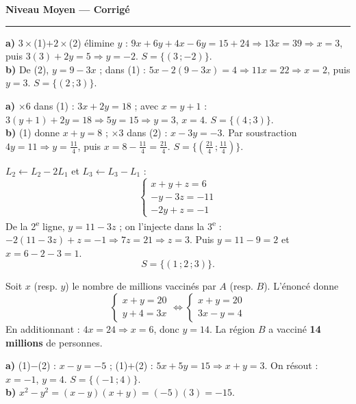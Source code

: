 \documentclass[11pt,a4paper]{article}
\begin{document}
\begin{center}
{\LARGE\bfseries\color{primarydark} Niveau Moyen — Corrigé}\\[2pt]
{\color{primary}\rule{0.45\textwidth}{1.2pt}}
\end{center}
\vspace{1mm}

\begin{corrige}[combinaison]
\textbf{a)} $3\times$(1)$+2\times$(2) élimine $y$ : $9x+6y+4x-6y=15+24\Rightarrow 13x=39\Rightarrow x=3$, puis
$3(3)+2y=5\Rightarrow y=-2$. $S=\{(3\,;-2)\}$.\\
\textbf{b)} De (2), $y=9-3x$ ; dans (1) : $5x-2(9-3x)=4\Rightarrow 11x=22\Rightarrow x=2$, puis $y=3$. $S=\{(2\,;3)\}$.
\end{corrige}

\begin{corrige}
\textbf{a)} $\times6$ dans (1) : $3x+2y=18$ ; avec $x=y+1$ : $3(y+1)+2y=18\Rightarrow 5y=15\Rightarrow y=3$, $x=4$. $S=\{(4\,;3)\}$.\\
\textbf{b)} (1) donne $x+y=8$ ; $\times3$ dans (2) : $x-3y=-3$. Par soustraction $4y=11\Rightarrow y=\tfrac{11}{4}$,
puis $x=8-\tfrac{11}{4}=\tfrac{21}{4}$. $S=\bigl\{(\tfrac{21}{4}\,;\tfrac{11}{4})\bigr\}$.
\end{corrige}

\begin{corrige}
$L_2\leftarrow L_2-2L_1$ et $L_3\leftarrow L_3-L_1$ :
\[ \begin{cases} x+y+z=6\\ -y-3z=-11\\ -2y+z=-1\end{cases} \]
De la 2\textsuperscript{e} ligne, $y=11-3z$ ; on l'injecte dans la 3\textsuperscript{e} :
$-2(11-3z)+z=-1\Rightarrow 7z=21\Rightarrow z=3$. Puis $y=11-9=2$ et $x=6-2-3=1$.
\[ S=\{(1\,;2\,;3)\}. \]
\end{corrige}

\begin{corrige}
Soit $x$ (resp. $y$) le nombre de millions vaccinés par $A$ (resp. $B$). L'énoncé donne
\[ \begin{cases} x+y=20\\ y+4=3x\end{cases}\iff \begin{cases} x+y=20\\ 3x-y=4\end{cases} \]
En additionnant : $4x=24\Rightarrow x=6$, donc $y=14$. La région $B$ a vacciné \textbf{14 millions} de personnes.
\end{corrige}

\begin{corrige}
\textbf{a)} (1)$-$(2) : $x-y=-5$ ; (1)$+$(2) : $5x+5y=15\Rightarrow x+y=3$. On résout : $x=-1$, $y=4$. $S=\{(-1\,;4)\}$.\\
\textbf{b)} $x^{2}-y^{2}=(x-y)(x+y)=(-5)(3)=-15$.
\end{corrige}
\end{document}
